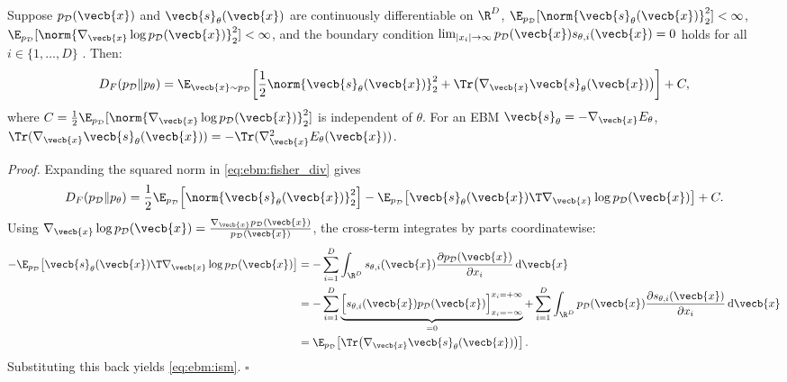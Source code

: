 \documentclass[../../../../master.tex]{subfiles}
\begin{document}
\begin{coremath}
Suppose $p_{\mathcal{D}}(\vecb{x})$ and $\vecb{s}_\theta(\vecb{x})$ are continuously differentiable on $\R^D$, $\E_{p_{\mathcal{D}}}[\norm{\vecb{s}_\theta(\vecb{x})}_2^2] < \infty$, $\E_{p_{\mathcal{D}}}[\norm{\nabla_{\vecb{x}}\log p_{\mathcal{D}}(\vecb{x})}_2^2] < \infty$, and the boundary condition $\lim_{|x_i| \to \infty} p_{\mathcal{D}}(\vecb{x}) s_{\theta,i}(\vecb{x}) = 0$ holds for all $i \in \{1,\dots,D\}$ . Then:
\begin{equation}
  D_F(p_{\mathcal{D}} \| p_\theta) = \E_{\vecb{x} \sim p_{\mathcal{D}}}\!\left[ \frac{1}{2}\norm{\vecb{s}_\theta(\vecb{x})}_2^2 + \Tr\bigl(\nabla_{\vecb{x}} \vecb{s}_\theta(\vecb{x})\bigr) \right] + C,
  \label{eq:ebm:ism}
\end{equation}
where $C = \frac{1}{2}\E_{p_{\mathcal{D}}}[\norm{\nabla_{\vecb{x}}\log p_{\mathcal{D}}(\vecb{x})}_2^2]$ is independent of $\theta$. For an EBM $\vecb{s}_\theta = -\nabla_{\vecb{x}} E_\theta$, $\Tr(\nabla_{\vecb{x}}\vecb{s}_\theta(\vecb{x})) = -\Tr(\nabla_{\vecb{x}}^2 E_\theta(\vecb{x}))$.

\textit{Proof.} Expanding the squared norm in \eqref{eq:ebm:fisher_div} gives
\[
  D_F(p_{\mathcal{D}} \| p_\theta) = \frac{1}{2}\E_{p_{\mathcal{D}}}\!\left[\norm{\vecb{s}_\theta(\vecb{x})}_2^2\right] - \E_{p_{\mathcal{D}}}\!\left[\vecb{s}_\theta(\vecb{x})\T \nabla_{\vecb{x}} \log p_{\mathcal{D}}(\vecb{x})\right] + C.
\]
Using $\nabla_{\vecb{x}} \log p_{\mathcal{D}}(\vecb{x}) = \frac{\nabla_{\vecb{x}} p_{\mathcal{D}}(\vecb{x})}{p_{\mathcal{D}}(\vecb{x})}$, the cross-term integrates by parts coordinatewise:
\begin{align*}
  -\E_{p_{\mathcal{D}}}\!\left[\vecb{s}_\theta(\vecb{x})\T \nabla_{\vecb{x}} \log p_{\mathcal{D}}(\vecb{x})\right]
  &= -\sum_{i=1}^D \int_{\R^D} s_{\theta,i}(\vecb{x}) \frac{\partial p_{\mathcal{D}}(\vecb{x})}{\partial x_i} \, \mathrm{d}\vecb{x} \\
  &= -\sum_{i=1}^D \underbrace{\Bigl[ s_{\theta,i}(\vecb{x}) p_{\mathcal{D}}(\vecb{x}) \Bigr]_{x_i=-\infty}^{x_i=+\infty}}_{=0} + \sum_{i=1}^D \int_{\R^D} p_{\mathcal{D}}(\vecb{x}) \frac{\partial s_{\theta,i}(\vecb{x})}{\partial x_i} \, \mathrm{d}\vecb{x} \\
  &= \E_{p_{\mathcal{D}}}\!\left[\Tr\bigl(\nabla_{\vecb{x}} \vecb{s}_\theta(\vecb{x})\bigr)\right].
\end{align*}
Substituting this back yields \eqref{eq:ebm:ism}. \hfill $\square$
\end{coremath}
\end{document}
